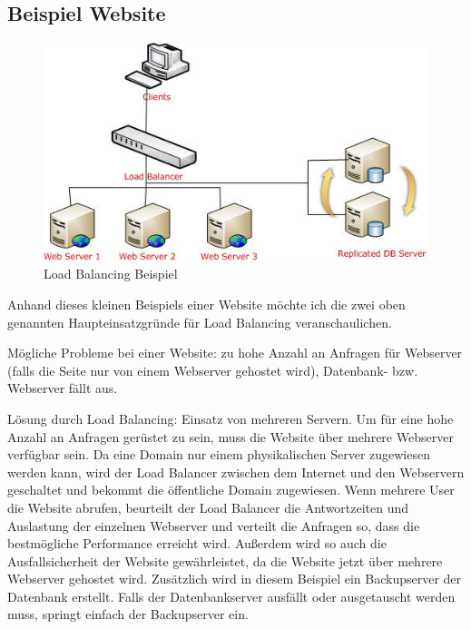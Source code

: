 \pagebreak
\subsection{Beispiel Website}
\label{sec:Beispiel Website}
\begin{figure}[!h]
	\begin{center}
		\includegraphics[width=0.7\linewidth]{images/loadbalancing1.jpg}
		\caption{Load Balancing Beispiel \cite{LoadBalancingGrafik1}}
		\label{Load Balancing Beispiel}
	\end{center}
\end{figure}
Anhand dieses kleinen Beispiels einer Website möchte ich die zwei oben genannten Haupteinsatzgründe für Load Balancing veranschaulichen. 

Mögliche Probleme bei einer Website: zu hohe Anzahl an Anfragen für Webserver (falls die Seite nur von einem Webserver gehostet wird), Datenbank- bzw. Webserver fällt aus.

Lösung durch Load Balancing: Einsatz von mehreren Servern. Um für eine hohe Anzahl an Anfragen gerüstet zu sein, muss die Website über mehrere Webserver verfügbar sein. Da eine Domain nur einem physikalischen Server zugewiesen werden kann, wird der Load Balancer zwischen dem Internet und den Webservern geschaltet und bekommt die öffentliche Domain zugewiesen. Wenn mehrere User die Website abrufen, beurteilt der Load Balancer die Antwortzeiten und Auslastung der einzelnen Webserver und verteilt die Anfragen so, dass die bestmögliche Performance erreicht wird. Außerdem wird so auch die Ausfallsicherheit der Website gewährleistet, da die Website jetzt über mehrere Webserver gehostet wird. Zusätzlich wird in diesem Beispiel ein Backupserver der Datenbank erstellt. Falls der Datenbankserver ausfällt oder ausgetauscht werden muss, springt einfach der Backupserver ein.      

\pagebreak
